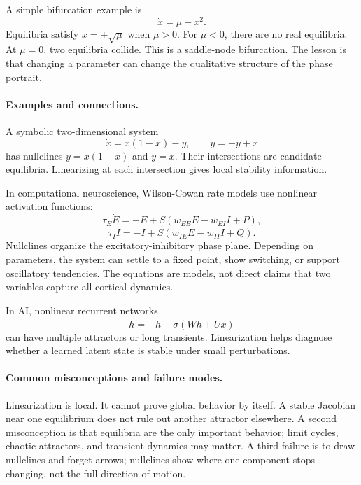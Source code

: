 A simple bifurcation example is
\[
\dot x=\mu-x^2.
\]
Equilibria satisfy \(x=\pm\sqrt{\mu}\) when \(\mu>0\). For \(\mu<0\), there are no real equilibria. At \(\mu=0\), two equilibria collide. This is a saddle-node bifurcation. The lesson is that changing a parameter can change the qualitative structure of the phase portrait.

\paragraph{Examples and connections.}
A symbolic two-dimensional system
\[
\dot x=x(1-x)-y,\qquad
\dot y=-y+x
\]
has nullclines \(y=x(1-x)\) and \(y=x\). Their intersections are candidate equilibria. Linearizing at each intersection gives local stability information.

In computational neuroscience, Wilson-Cowan rate models use nonlinear activation functions:
\[
\tau_E\dot E=-E+S(w_{EE}E-w_{EI}I+P),
\]
\[
\tau_I\dot I=-I+S(w_{IE}E-w_{II}I+Q).
\]
Nullclines organize the excitatory-inhibitory phase plane. Depending on parameters, the system can settle to a fixed point, show switching, or support oscillatory tendencies. The equations are models, not direct claims that two variables capture all cortical dynamics.

In AI, nonlinear recurrent networks
\[
\dot h=-h+\sigma(Wh+Ux)
\]
can have multiple attractors or long transients. Linearization helps diagnose whether a learned latent state is stable under small perturbations.

\paragraph{Common misconceptions and failure modes.}
Linearization is local. It cannot prove global behavior by itself. A stable Jacobian near one equilibrium does not rule out another attractor elsewhere. A second misconception is that equilibria are the only important behavior; limit cycles, chaotic attractors, and transient dynamics may matter. A third failure is to draw nullclines and forget arrows; nullclines show where one component stops changing, not the full direction of motion.

